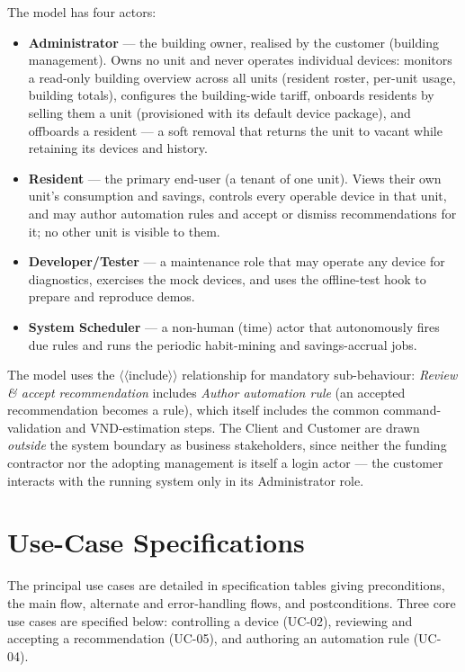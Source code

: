 The model has four actors:

\begin{itemize}
  \item \textbf{Administrator} --- the building owner, realised by the customer (building
  management). Owns no unit and never operates individual devices: monitors a read-only
  building overview across all units (resident roster, per-unit usage, building totals),
  configures the building-wide tariff, onboards residents by selling them a unit
  (provisioned with its default device package), and offboards a resident --- a soft
  removal that returns the unit to vacant while retaining its devices and history.
  \item \textbf{Resident} --- the primary end-user (a tenant of one unit). Views their own
  unit's consumption and savings, controls every operable device in that unit, and may
  author automation rules and accept or dismiss recommendations for it; no other unit is
  visible to them.
  \item \textbf{Developer/Tester} --- a maintenance role that may operate any device
  for diagnostics, exercises the mock devices, and uses the offline-test hook to
  prepare and reproduce demos.
  \item \textbf{System Scheduler} --- a non-human (time) actor that autonomously fires
  due rules and runs the periodic habit-mining and savings-accrual jobs.
\end{itemize}

The model uses the $\langle\langle$include$\rangle\rangle$ relationship for mandatory
sub-behaviour: \emph{Review \& accept recommendation} includes \emph{Author automation
rule} (an accepted recommendation becomes a rule), which itself includes the common
command-validation and VND-estimation steps. The Client and Customer
are drawn \emph{outside} the system boundary as business stakeholders, since neither
the funding contractor nor the adopting management is itself a login actor --- the
customer interacts with the running system only in its Administrator role.

\section{Use-Case Specifications}
\label{sec:uc-spec}

The principal use cases are detailed in specification tables giving
preconditions, the main flow, alternate and error-handling flows, and postconditions.
Three core use cases are specified below: controlling a device (UC-02), reviewing and
accepting a recommendation (UC-05), and authoring an automation rule (UC-04).

